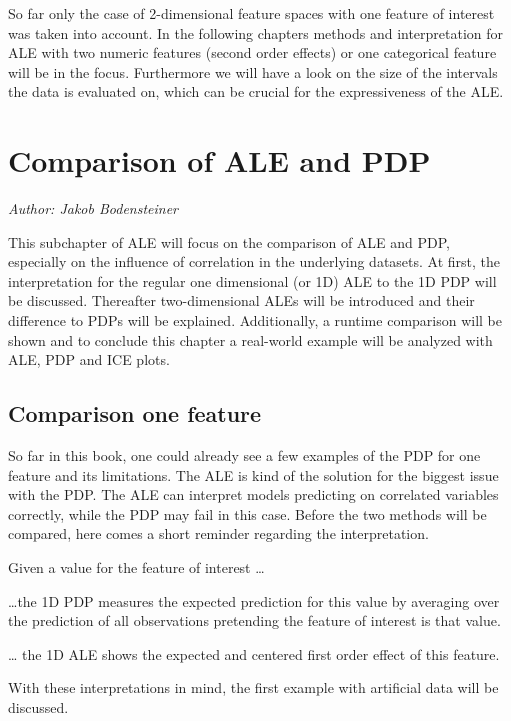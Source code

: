\documentclass[
]{krantz}
\begin{document}
So far only the case of 2-dimensional feature spaces with one feature of interest was taken into account. In the following chapters methods and interpretation for ALE with two numeric features (second order effects) or one categorical feature will be in the focus. Furthermore we will have a look on the size of the intervals the data is evaluated on, which can be crucial for the expressiveness of the ALE.

\hypertarget{comparison-of-ale-and-pdp}{%
\chapter{Comparison of ALE and PDP}\label{comparison-of-ale-and-pdp}}

\emph{Author: Jakob Bodensteiner}

This subchapter of ALE will focus on the comparison of ALE and PDP, especially on the influence of correlation in the underlying datasets. At first, the interpretation for the regular one dimensional (or 1D) ALE to the 1D PDP will be discussed. Thereafter two-dimensional ALEs will be introduced and their difference to PDPs will be explained. Additionally, a runtime comparison will be shown and to conclude this chapter a real-world example will be analyzed with ALE, PDP and ICE plots.

\hypertarget{comparison-one-feature}{%
\section{Comparison one feature}\label{comparison-one-feature}}

So far in this book, one could already see a few examples of the PDP for one feature and its limitations. The ALE is kind of the solution for the biggest issue with the PDP. The ALE can interpret models predicting on correlated variables correctly, while the PDP may fail in this case. Before the two methods will be compared, here comes a short reminder regarding the interpretation.

Given a value for the feature of interest \ldots{}

\ldots the 1D PDP measures the expected prediction for this value by averaging over the prediction of all observations pretending the feature of interest is that value.

\ldots{} the 1D ALE shows the expected and centered first order effect of this feature.

With these interpretations in mind, the first example with artificial data will be discussed.
\end{document}
